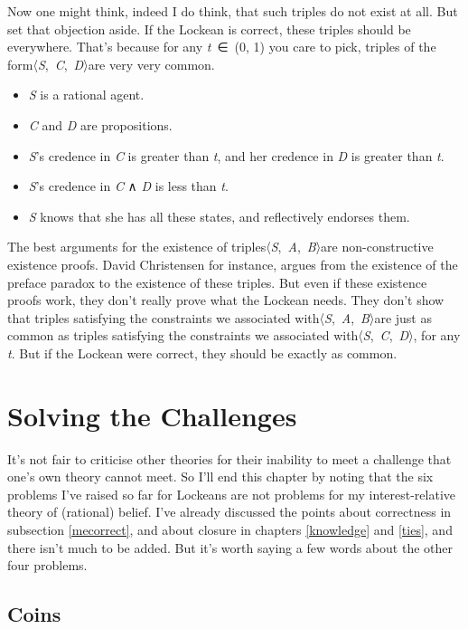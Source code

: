 \documentclass[
  11pt,
]{book}
\providecommand{\tightlist}{%
  \setlength{\itemsep}{0pt}\setlength{\parskip}{0pt}}
\begin{document}
Now one might think, indeed I do think, that such triples do not exist at all. But set that objection aside. If the Lockean is correct, these triples should be everywhere. That's because for any \emph{t}~∈~(0, 1) you care to pick, triples of the form〈\emph{S},~\emph{C},~\emph{D}〉are very very common.

\begin{itemize}
\tightlist
\item
  \emph{S} is a rational agent.
\item
  \emph{C} and \emph{D} are propositions.
\item
  \emph{S}'s credence in \emph{C} is greater than \emph{t}, and her credence in \emph{D} is greater than \emph{t}.
\item
  \emph{S}'s credence in \emph{C} ∧ \emph{D} is less than \emph{t}.
\item
  \emph{S} knows that she has all these states, and reflectively endorses them.
\end{itemize}

The best arguments for the existence of triples〈\emph{S},~\emph{A},~\emph{B}〉are non-constructive existence proofs. David Christensen \citeyearpar{Christensen2005} for instance, argues from the existence of the preface paradox to the existence of these triples. But even if these existence proofs work, they don't really prove what the Lockean needs. They don't show that triples satisfying the constraints we associated with〈\emph{S},~\emph{A},~\emph{B}〉are just as common as triples satisfying the constraints we associated with〈\emph{S},~\emph{C},~\emph{D}〉, for any \emph{t}. But if the Lockean were correct, they should be exactly as common.

\hypertarget{solving}{%
\section{Solving the Challenges}\label{solving}}

It's not fair to criticise other theories for their inability to meet a challenge that one's own theory cannot meet. So I'll end this chapter by noting that the six problems I've raised so far for Lockeans are not problems for my interest-relative theory of (rational) belief. I've already discussed the points about correctness in subsection \ref{mecorrect}, and about closure in chapters \ref{knowledge} and \ref{ties}, and there isn't much to be added. But it's worth saying a few words about the other four problems.

\hypertarget{coins}{%
\subsection{Coins}\label{coins}}
\end{document}
